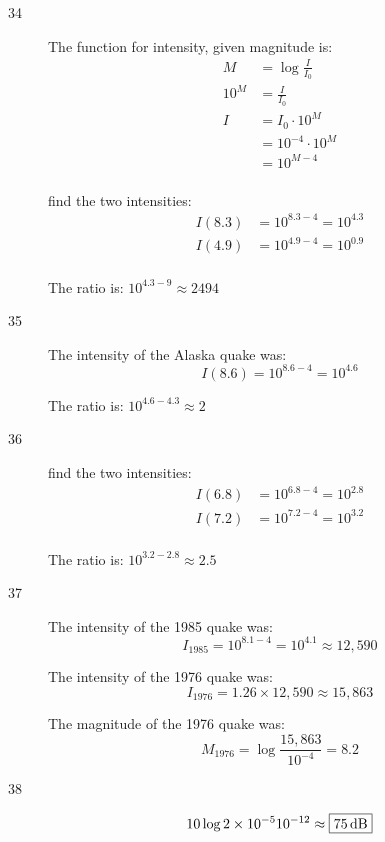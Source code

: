 \documentclass{exam}
\begin{document}
\begin{description}
      \item[34]
        The function for intensity, given magnitude is:
        \begin{align*}
          M    & = \log \frac{I}{I_0} \\
          10^M & = \frac{I}{I_0} \\
          I     & = I_0 \cdot 10^M \\
                & = 10^{-4} \cdot 10^M \\
                & = 10^{M - 4} \\
        \end{align*}

        find the two intensities:
        \begin{align*}
          I(8.3) &= 10^{8.3 - 4} = 10^{4.3} \\
          I(4.9) &= 10^{4.9 - 4} = 10^{0.9} \\
        \end{align*}

        The ratio is: $10^{4.3 - 9} \approx \boxed{2494}$ 

      \item[35]
        The intensity of the Alaska quake was:
        \[
          I(8.6) = 10^{8.6 - 4} = 10^{4.6}
        \]

        The ratio is: $10^{4.6 - 4.3} \approx \boxed{2}$ 

      \item[36]
        find the two intensities:
        \begin{align*}
          I(6.8) &= 10^{6.8 - 4} = 10^{2.8} \\
          I(7.2) &= 10^{7.2 - 4} = 10^{3.2} \\
        \end{align*}

        The ratio is: $10^{3.2 - 2.8} \approx \boxed{2.5}$ 

      \item[37]
        The intensity of the 1985 quake was:
        \[
          I_{1985} = 10^{8.1 - 4} = 10^{4.1} \approx 12,590
        \]

        The intensity of the 1976 quake was: 
        \[
          I_{1976} = 1.26 \times 12,590 \approx 15,863
        \]

        The magnitude of the 1976 quake was:
        \[
          M_{1976} = \log \frac{15,863}{10^{-4}} = \boxed{8.2}
        \]

      \item[38]
        \[
          10 \log{2 \times 10^{-5}}{10^{-12}} \approx \boxed{\unit[75]{dB}} 
        \]


\end{description}
\end{document}
